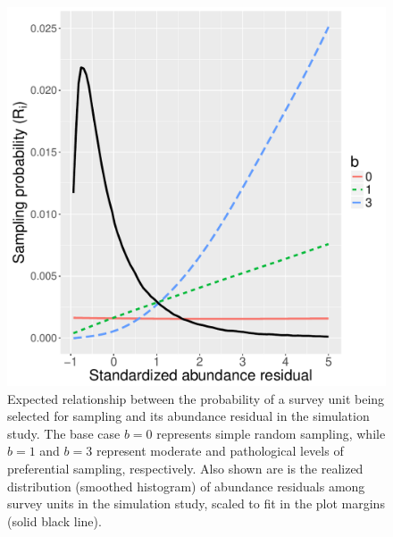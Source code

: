\documentclass[times,mee,doublespace,]{besauth2}
\begin{document}
\begin{figure} %
\begin{center}
\includegraphics[width=170mm]{sim_R.pdf}
\caption{Expected relationship between the probability of a survey unit being selected for sampling and its abundance residual in the simulation study. The base case $b=0$ represents simple random sampling, while $b=1$ and $b=3$ represent moderate and pathological levels of preferential sampling, respectively.  Also shown are is the realized distribution (smoothed histogram) of abundance residuals among survey units in the simulation study, scaled to fit in the plot margins (solid black line).}
\label{fig:sim_R}
\end{center}
\end{figure}
\end{document}
